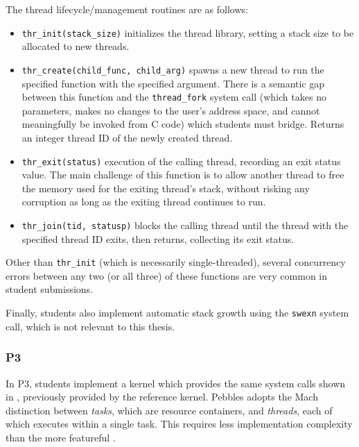 The thread lifecycle/management routines are as follows:
\begin{itemize}
	\item {\tt thr\_init(stack\_size)} initializes the thread library, setting a  stack size to be allocated to new threads.
	\item {\tt thr\_create(child\_func, child\_arg)} spawns a new thread to run the specified function with the specified argument. There is a semantic gap between this function and the {\tt thread\_fork} system call (which takes no parameters, makes no changes to the user's address space, and cannot meaningfully be invoked from C code) which students must bridge.
		Returns an integer thread ID of the newly created thread.
	\item {\tt thr\_exit(status)}  execution of the calling thread, recording an exit status value.
		The main challenge of this function is to allow another thread to free the memory used for the exiting thread's stack,
		without risking any corruption as long as the exiting thread continues to run.
	\item {\tt thr\_join(tid, statusp)} blocks the calling thread until the thread with the specified thread ID exits, then returns, collecting its exit status.
\end{itemize}
Other than {\tt thr\_init} (which is necessarily single-threaded), several concurrency errors between any two (or all three) of these functions are very common in student submissions.

Finally, students also implement automatic stack growth using the {\tt swexn} system call, which is not relevant to this thesis.

\subsubsection{P3}
In P3, students implement a kernel which provides the same system calls shown in , previously provided by the reference kernel.
Pebbles adopts the Mach \cite{DBLP:conf/usenix/AccettaBBGRTY86} distinction between {\em tasks}, which are resource containers, and {\em threads}, each of which executes within a single task.
This requires less implementation complexity than the more featureful
.

